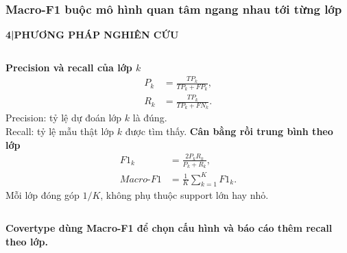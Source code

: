 \documentclass[aspectratio=169,12pt]{beamer}
\newcommand{\chaptertag}[2]{%
  \vspace{-0.16cm}%
  {\scriptsize\bfseries\textcolor{boxframe}{#1\enspace |\enspace #2}}\par
  \vspace{0.12cm}%
}
\begin{document}
\begin{frame}
  \frametitle{Macro-F1 buộc mô hình quan tâm ngang nhau tới từng lớp}
  \chaptertag{4}{PHƯƠNG PHÁP NGHIÊN CỨU}
  \footnotesize
  \begin{columns}[T,onlytextwidth]
      \textbf{Precision và recall của lớp $k$}
      \begin{align*}
        P_k &= \frac{TP_k}{TP_k+FP_k},\\[-0.08cm]
        R_k &= \frac{TP_k}{TP_k+FN_k}.
      \end{align*}
      Precision: tỷ lệ dự đoán lớp $k$ là đúng.\\[0.08cm]
      Recall: tỷ lệ mẫu thật lớp $k$ được tìm thấy.
      \textbf{Cân bằng rồi trung bình theo lớp}
      \begin{align*}
        F1_k &= \frac{2P_kR_k}{P_k+R_k},\\[-0.08cm]
        Macro\text{-}F1 &= \frac{1}{K}\sum_{k=1}^{K}F1_k.
      \end{align*}
      Mỗi lớp đóng góp $1/K$, không phụ thuộc support lớn hay nhỏ.
  \end{columns}
  \vspace{0.18cm}
  \centering
  \textbf{Covertype dùng Macro-F1 để chọn cấu hình và báo cáo thêm recall theo lớp.}
\end{frame}
\end{document}

